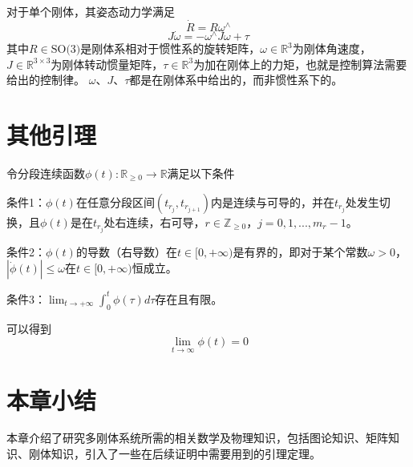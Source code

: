 对于单个刚体，其姿态动力学满足
\begin{equation}
    \label{eq:dynamic1}
    \dot R=R\omega^\wedge
\end{equation}
\begin{equation}
    \label{eq:dynamic2}
    J\dot \omega=-\omega^\wedge J\omega+\tau
\end{equation}
其中$R\in\text{SO(3)}$是刚体系相对于惯性系的旋转矩阵，$\omega\in\mathbb{R}^3$为刚体角速度，$J\in\mathbb{R}^{3\times 3}$为刚体转动惯量矩阵，$\tau\in\mathbb{R}^3$为加在刚体上的力矩，也就是控制算法需要给出的控制律。
$\omega$、$J$、$\tau$都是在刚体系中给出的，而非惯性系下的。
\section{其他引理}
\begin{lemma}\cite{lin2012new}
    令分段连续函数$\phi(t):\mathbb{R}_{\geq0}\rightarrow\mathbb{R}$满足以下条件

    条件1：$\phi(t)$在任意分段区间$(t_{r_j},t_{r_{j+1}})$内是连续与可导的，并在$t_{r_j}$处发生切换，且$\phi(t)$是在$t_{r_j}$处右连续，右可导，$r\in\mathbb{Z}_{\geq0}$，$j=0,1,...,m_r-1$。

    条件2：$\phi(t)$的导数（右导数）在$t\in[0,+\infty)$是有界的，即对于某个常数$\omega>0$，$|\dot\phi(t)|\leq\omega$在$t\in[0,+\infty)$恒成立。

    条件3：$\lim_{t\rightarrow+\infty}\int_{0}^t\phi(\tau)d\tau$存在且有限。

    可以得到
    \begin{equation}
        \lim_{t\rightarrow\infty}\phi(t)=0
    \end{equation}
\end{lemma}
\section{本章小结}
本章介绍了研究多刚体系统所需的相关数学及物理知识，包括图论知识、矩阵知识、刚体知识，引入了一些在后续证明中需要用到的引理定理。
